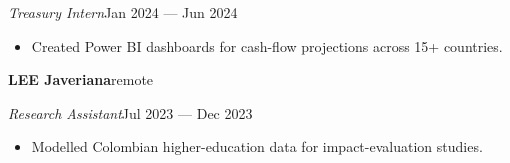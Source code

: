 \documentclass[a4paper,10pt]{article}
\newcommand{\row}[2]{\textbf{\color{ink}#1}\hfill{\small #2}\par}
\begin{document}
\textit{Treasury Intern}\hfill{\small Jan 2024 --- Jun 2024}\par
\begin{itemize}[leftmargin=1em, itemsep=0pt, topsep=1pt, parsep=0pt]
  \item Created Power BI dashboards for cash-flow projections across 15+ countries.
\end{itemize}
\vspace{2pt}
\row{LEE Javeriana}{remote}
\textit{Research Assistant}\hfill{\small Jul 2023 --- Dec 2023}\par
\begin{itemize}[leftmargin=1em, itemsep=0pt, topsep=1pt, parsep=0pt]
  \item Modelled Colombian higher-education data for impact-evaluation studies.
\end{itemize}
\end{document}
